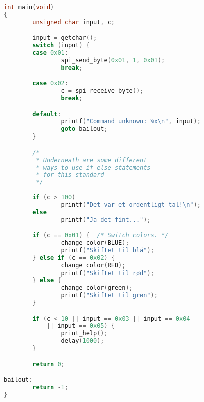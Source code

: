 \documentclass[article, 10pt]{memoir}
\begin{document}
\begin{landscape}
\begin{multicols}{2}
\begin{lstlisting}[language=c]
int main(void)
{
        unsigned char input, c;

        input = getchar();
        switch (input) {
        case 0x01:
                spi_send_byte(0x01, 1, 0x01);
                break;

        case 0x02:
                c = spi_receive_byte();
                break;

        default:
                printf("Command unknown: %x\n", input);
                goto bailout;
        }

        /* 
         * Underneath are some different 
         * ways to use if-else statements
         * for this standard 
         */
    
        if (c > 100)
                printf("Det var et ordentligt tal!\n");
        else
                printf("Ja det fint...");

        if (c == 0x01) {  /* Switch colors. */
                change_color(BLUE);
                printf("Skiftet til blå");
        } else if (c == 0x02) {
                change_color(RED);
                printf("Skiftet til rød");
        } else {
                change_color(green);
                printf("Skiftet til grøn");
        }

        if (c < 10 || input == 0x03 || input == 0x04
            || input == 0x05) {
                print_help();
                delay(1000);
        }

        return 0;

bailout:
        return -1;
}
        \end{lstlisting}
    \end{multicols}
\end{landscape}
\end{document}
